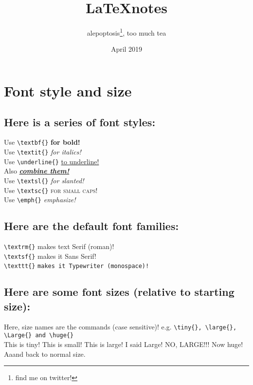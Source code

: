 \documentclass[12pt, letterpaper]{article} %
\title{\LaTeX notes} %
\author{alepoptosis\thanks{find me on twitter!}, too much tea}
\date{April 2019} %
\begin{document}

\maketitle %

\section{Font style and size}

\subsection*{Here is a series of font styles:}

Use \verb+\textbf{}+ \textbf{for bold!} \\ %
Use \verb+\textit{}+ \textit{for italics!} \\ %
Use \verb+\underline{}+ \underline{to underline!} \\
Also \textbf{\textit{\underline{combine them!}}} \\
Use \verb+\textsl{}+ \textsl{for slanted!} \\
Use \verb+\textsc{}+ \textsc{for small caps!} \\
Use \verb+\emph{}+ \emph{emphasize!} %

\subsection*{Here are the default font families:}

\verb+\textrm{}+ \textrm{makes text Serif (roman)!} \\
\verb+\textsf{}+ \textsf{makes it Sans Serif!} \\
\verb+\texttt{}+ \texttt{makes it Typewriter (monospace)!} 

\subsection*{Here are some font sizes (relative to starting size):} 
Here, size names are the commands (case sensitive)! e.g. 
\verb+\tiny{}, \large{}, \Large{} and \huge{}+\\

\tiny{This is tiny!}
\small{This is small!}
\large{This is large!}
\Large{I said Large!}
\LARGE{NO, LARGE!!!}
\huge{Now huge!}
\normalsize{Aaand back to normal size.}
\end{document}
